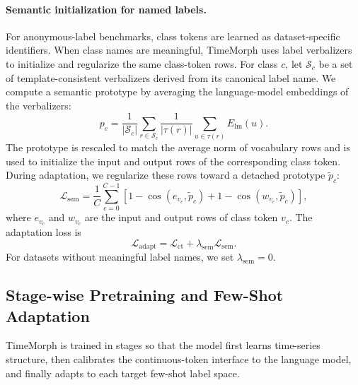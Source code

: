 \documentclass{article}
\begin{document}
\paragraph{Semantic initialization for named labels.}
For anonymous-label benchmarks, class tokens are learned as dataset-specific
identifiers. When class names are meaningful, TimeMorph uses label verbalizers to
initialize and regularize the same class-token rows. For class $c$, let
$\mathcal{S}_c$ be a set of template-consistent verbalizers derived from its
canonical label name. We compute a semantic prototype by averaging the
language-model embeddings of the verbalizers:
\begin{equation}
\label{eq:semantic-prototype}
p_c
=
\frac{1}{|\mathcal{S}_c|}
\sum_{r\in\mathcal{S}_c}
\frac{1}{|\tau(r)|}
\sum_{u\in\tau(r)}
E_{\mathrm{lm}}(u).
\end{equation}
The prototype is rescaled to match the average norm of vocabulary rows and is
used to initialize the input and output rows of the corresponding class token.
During adaptation, we regularize these rows toward a detached prototype
$\tilde{p}_c$:
\begin{equation}
\label{eq:semantic-row-reg}
\mathcal{L}_{\mathrm{sem}}
=
\frac{1}{C}
\sum_{c=0}^{C-1}
\left[
1-\cos(e_{v_c},\tilde{p}_c)
+
1-\cos(w_{v_c},\tilde{p}_c)
\right],
\end{equation}
where $e_{v_c}$ and $w_{v_c}$ are the input and output rows of class token $v_c$.
The adaptation loss is
\begin{equation}
\label{eq:adapt-loss}
\mathcal{L}_{\mathrm{adapt}}
=
\mathcal{L}_{\mathrm{ct}}
+
\lambda_{\mathrm{sem}}\mathcal{L}_{\mathrm{sem}}.
\end{equation}
For datasets without meaningful label names, we set $\lambda_{\mathrm{sem}}=0$.

\subsection{Stage-wise Pretraining and Few-Shot Adaptation}
\label{sec:stage-wise-transfer}

TimeMorph is trained in stages so that the model first learns time-series
structure, then calibrates the continuous-token interface to the language model,
and finally adapts to each target few-shot label space.
\end{document}
